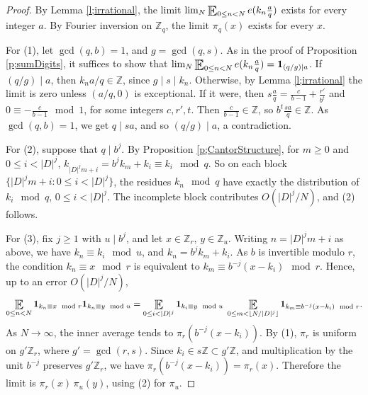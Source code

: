 \begin{proof}
By Lemma \ref{l;irrational}, the limit $\lim_{N}\Expectation_{0\leq n<N}e(k_n\frac aq)$ exists for every integer $a$. 
By Fourier inversion on $\mathbb{Z}_q$, the limit $\pi_q(x)$ exists for every $x$. 

For (1), let $\gcd(q,b)=1$, and $g=\gcd(q,s)$. As in the proof of Proposition \ref{p;sumDigits}, it suffices to show that 
$\lim_N\Expectation_{0\leq n<N}e(k_n\frac aq)=\mathbf{1}_{(q/g)\mid a}$. 
If $(q/g)\mid a$, then $k_na/q\in\mathbb{Z}$, since $g\mid s\mid k_n$. 
Otherwise, by Lemma \ref{l;irrational} the limit is zero unless $(a/q,0)$ is exceptional. 
If it were, then $s\frac aq=\frac{c}{b-1}+\frac{r'}{b^t}$ and $0\equiv-\frac{c}{b-1}\mod 1$, for some integers $c,r',t$. 
Then $\frac{c}{b-1}\in\mathbb{Z}$, so $b^t\frac{sa}{q}\in\mathbb{Z}$. As $\gcd(q,b)=1$, we get $q\mid sa$, and so $(q/g)\mid a$, a contradiction. 

For (2), suppose that $q\mid b^j$. 
By Proposition \ref{p;CantorStructure}, for $m\geq0$ and $0\leq i<\lvert D\rvert^j$, $k_{\lvert D\rvert^jm+i}=b^jk_m+k_i\equiv k_i\mod q$. 
So on each block $\{\lvert D\rvert^jm+i\colon 0\leq i<\lvert D\rvert^j\}$, the residues $k_n\mod q$ have exactly the distribution of $k_i\mod q$, $0\leq i<\lvert D\rvert^j$. 
The incomplete block contributes $O(\lvert D\rvert^j/N)$, and (2) follows. 

For (3), fix $j\geq1$ with $u\mid b^j$, and let $x\in\mathbb{Z}_r$, $y\in\mathbb{Z}_u$. 
Writing $n=\lvert D\rvert^jm+i$ as above, we have $k_n\equiv k_i\mod u$, and $k_n=b^jk_m+k_i$. 
As $b$ is invertible modulo $r$, the condition $k_n\equiv x\mod r$ is equivalent to $k_m\equiv b^{-j}(x-k_i)\mod r$. 
Hence, up to an error $O(\lvert D\rvert^j/N)$, 
\begin{equation}
\Expectation_{0\leq n<N}\mathbf{1}_{k_n\equiv x\mod r}\mathbf{1}_{k_n\equiv y\mod u}
=\Expectation_{0\leq i<\lvert D\rvert^j}\mathbf{1}_{k_i\equiv y\mod u}\;
\Expectation_{0\leq m<\lfloor N/\lvert D\rvert^j\rfloor}\mathbf{1}_{k_m\equiv b^{-j}(x-k_i)\mod r}. 
\end{equation}
As $N\to\infty$, the inner average tends to $\pi_r(b^{-j}(x-k_i))$. 
By (1), $\pi_r$ is uniform on $g'\mathbb{Z}_r$, where $g'=\gcd(r,s)$. 
Since $k_i\in s\mathbb{Z}\subset g'\mathbb{Z}$, and multiplication by the unit $b^{-j}$ preserves $g'\mathbb{Z}_r$, we have $\pi_r(b^{-j}(x-k_i))=\pi_r(x)$. 
Therefore the limit is $\pi_r(x)\,\pi_u(y)$, using (2) for $\pi_u$. 
\end{proof}


